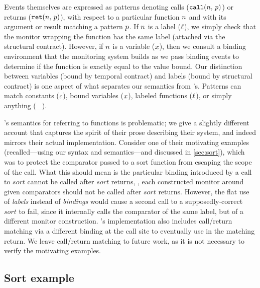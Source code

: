 Events themselves are expressed as patterns denoting calls (${\tt call}(n,\, p)$) or returns (${\tt ret}(n,\, p)$), with respect to a particular function $n$ and with its argument or result matching a pattern $p$.
%
If $n$ is a label ($\ell$), we simply check that the monitor wrapping the function has the same label (attached via the structural contract).
%
However, if $n$ is a variable ($x$), then we consult a binding environment that the monitoring system builds as we pass binding events to determine if the function is exactly equal to the value bound.
%
Our distinction between variables (bound by temporal contract) and labels (bound by structural contract) is one aspect of what separates our semantics from \citeauthor{ianjohnson:dfm:icfp2011}'s.
%
Patterns can match constants ($c$), bound variables ($x$), labeled functions ($\ell$), or simply anything ($\_$).

\citeauthor{ianjohnson:dfm:icfp2011}'s semantics for referring to functions is problematic; we give a slightly different account that captures the spirit of their prose describing their system, and indeed mirrors their actual implementation.
%
Consider one of their motivating examples (recalled---using our syntax and semantics---and discussed in \autoref{sec:sort}), which was to protect the comparator passed to a sort function from escaping the scope of the call.
%
What this should mean is the particular binding introduced by a call to $sort$ cannot be called after $sort$ returns, \ie, each constructed monitor around given comparators should not be called after $sort$ returns.
%
However, the flat use of \emph{labels} instead of \emph{bindings} would cause a second call to a supposedly-correct $sort$ to fail, since it internally calls the comparator of the same label, but of a different monitor construction.
%
\citeauthor{ianjohnson:dfm:icfp2011}'s implementation also includes call/return matching via a different binding at the call site to eventually use in the matching return.
%
We leave call/return matching to future work, as it is not necessary to verify the motivating examples.

\subsection{Sort example} \label{sec:sort}

